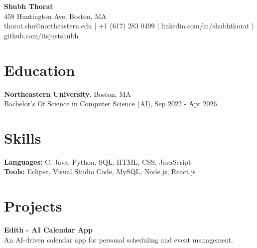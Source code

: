 \documentclass[letterpaper,10pt]{article}
\begin{document}
\begin{center}
    {\Large \textbf{{Shubh Thorat}}} \\
    {458 Huntington Ave, Boston, MA} \\
    {thorat.shu@northeastern.edu} | {+1 (617) 283 0499} | {linkedin.com/in/shubhthorat} | {github.com/itsjustshubh}
\end{center}

\section*{Education}
\textbf{{Northeastern University}}, {Boston, MA} \\
{{Bachelor’s Of Science}} in {{Computer Science (AI)}}, {Sep 2022 - Apr 2026}

\section*{Skills}
\textbf{Languages:} {C, Java, Python, SQL, HTML, CSS, JavaScript} \\
\textbf{Tools:} {Eclipse, Visual Studio Code, MySQL, Node.js, React.js}

\section*{Projects}
\textbf{{Edith - AI Calendar App}} \\
{{An AI-driven calendar app for personal scheduling and event management.}}
\end{document}
